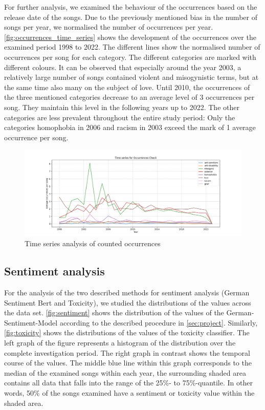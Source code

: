 For further analysis, we examined the behaviour of the occurrences based on the release date of the songs. Due to the previously mentioned bias in the number of songs per year, we normalised the number of occurrences per year. \autoref{fig:occurrences_time_series} shows the development of the occurrences over the examined period 1998 to 2022. The different lines show the normalised number of occurrences per song for each category. The different categories are marked with different colours. It can be observed that especially around the year 2003, a relatively large number of songs contained violent and misogynistic terms, but at the same time also many on the subject of love. Until 2010, the occurrences of the three mentioned categories decrease to an average level of 3 occurrences per song. They maintain this level in the following years up to 2022. The other categories are less prevalent throughout the entire study period: Only the categories homophobia in 2006 and racism in 2003 exceed the mark of 1 average occurrence per song.

\begin{figure}[!htb]
    \centering
    \includegraphics[width=\textwidth]{figures/time_series_occurrences.png}
    \caption{Time series analysis of counted occurrences}
    \label{fig:occurrences_time_series}
\end{figure}

\subsection*{Sentiment analysis}

For the analysis of the two described methods for sentiment analysis (German Sentiment Bert and Toxicity), we studied the distributions of the values across the data set. \autoref{fig:sentiment} shows the distribution of the values of the German-Sentiment-Model according to the described procedure in \autoref{sec:project}. Similarly, \autoref{fig:toxicity} shows the distributions of the values of the toxicity classifier. The left graph of the figure represents a histogram of the distribution over the complete investigation period. The right graph in contrast shows the temporal course of the values. The middle blue line within this graph corresponds to the median of the examined songs within each year, the surrounding shaded area contains all data that falls into the range of the 25\%- to 75\%-quantile. In other words, 50\% of the songs examined have a sentiment or toxicity value within the shaded area.

